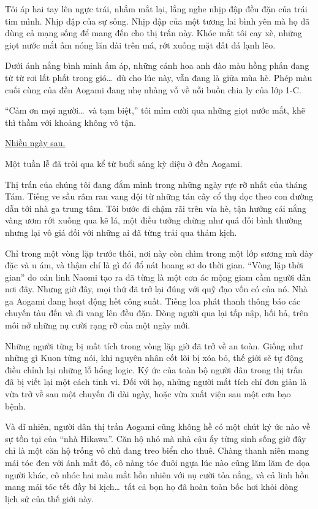 \documentclass[../main.tex]{subfiles}
\begin{document}
Tôi áp hai tay lên ngực trái, nhắm mắt lại, lắng nghe nhịp đập đều đặn của trái tim mình. Nhịp đập của sự sống. Nhịp đập của một tương lai bình yên mà họ đã dùng cả mạng sống để mang đến cho thị trấn này. Khóe mắt tôi cay xè, những giọt nước mắt ấm nóng lăn dài trên má, rớt xuống mặt đất đá lạnh lẽo.

Dưới ánh nắng bình minh ấm áp, những cánh hoa anh đào màu hồng phấn đang từ từ rơi lất phất trong gió\dots\ dù cho lúc này, vẫn đang là giữa mùa hè. Phép màu cuối cùng của đền Aogami đang nhẹ nhàng vỗ về nỗi buồn chia ly của lớp 1-C.

``Cảm ơn mọi người\dots\ và tạm biệt,'' tôi mỉm cười qua những giọt nước mắt, khẽ thì thầm với khoảng không vô tận.

\begin{center}
  \uline{Nhiều ngày sau.}
\end{center}

Một tuần lễ đã trôi qua kể từ buổi sáng kỳ diệu ở đền Aogami.

Thị trấn của chúng tôi đang đắm mình trong những ngày rực rỡ nhất của tháng Tám. Tiếng ve sầu râm ran vang dội từ những tán cây cổ thụ dọc theo con đường dẫn tới nhà ga trung tâm. Tôi bước đi chậm rãi trên vỉa hè, tận hưởng cái nắng vàng ươm rớt xuống qua kẽ lá, một điều tưởng chừng như quá đỗi bình thường nhưng lại vô giá đối với những ai đã từng trải qua thảm kịch.

Chỉ trong một vòng lặp trước thôi, nơi này còn chìm trong một lớp sương mù dày đặc và u ám, và thậm chí là gì đó đổ nát hoang sơ do thời gian. ``Vòng lặp thời gian'' do oán linh Naomi tạo ra đã từng là một cơn ác mộng giam cầm người dân nơi đây. Nhưng giờ đây, mọi thứ đã trở lại đúng với quỹ đạo vốn có của nó. Nhà ga Aogami đang hoạt động hết công suất. Tiếng loa phát thanh thông báo các chuyến tàu đến và đi vang lên đều đặn. Dòng người qua lại tấp nập, hối hả, trên môi nở những nụ cười rạng rỡ của một ngày mới.

Những người từng bị mất tích trong vòng lặp giờ đã trở về an toàn. Giống như những gì Kuon từng nói, khi nguyên nhân cốt lõi bị xóa bỏ, thế giới sẽ tự động điều chỉnh lại những lỗ hổng logic. Ký ức của toàn bộ người dân trong thị trấn đã bị viết lại một cách tinh vi. Đối với họ, những người mất tích chỉ đơn giản là vừa trở về sau một chuyến đi dài ngày, hoặc vừa xuất viện sau một cơn bạo bệnh.

Và dĩ nhiên, người dân thị trấn Aogami cũng không hề có một chút ký ức nào về sự tồn tại của ``nhà Hikawa''. Căn hộ nhỏ mà nhà cậu ấy từng sinh sống giờ đây chỉ là một căn hộ trống vô chủ đang treo biển cho thuê. Chàng thanh niên mang mái tóc đen với ánh mắt đỏ, cô nàng tóc đuôi ngựa lúc nào cũng lăm lăm đe dọa người khác, cô nhóc hai màu mắt hồn nhiên với nụ cười tỏa nắng, và cả linh hồn mang mái tóc tết đầy bi kịch\dots\ tất cả bọn họ đã hoàn toàn bốc hơi khỏi dòng lịch sử của thế giới này.
\end{document}
